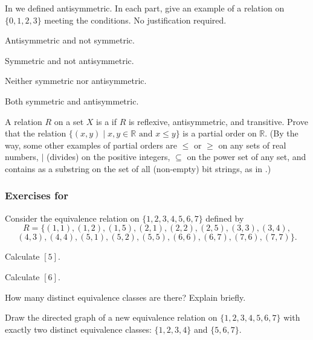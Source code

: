 \begin{exer}[\exerE] %
\label{exer_ppty_rel_sym_vs_antisym}
    In  we defined antisymmetric. In each part, give an example of a relation on $\{0,1,2,3\}$ meeting the conditions. No justification required.
        \begin{exerpart}
            \item Antisymmetric and not symmetric.
            \item Symmetric and not antisymmetric.
            \item Neither symmetric nor antisymmetric.
            \item Both symmetric and antisymmetric.
        \end{exerpart}
\end{exer}

\begin{exer}[\exerE] %
\label{exer_defn_partial_order}
    A relation $R$ on a set $X$ is a  if $R$ is reflexive, antisymmetric, and transitive. Prove that the relation $\{ (x,y) \mid x, y  \in \mathbb{R} \text{ and } x \le y \}$ is a partial order on $\mathbb{R}$.      
    (By the way, some other examples of partial orders are $\le$ or $\ge$ on any sets of real numbers, $\mid$ (divides) on the positive integers, $\subseteq$ on the power set of any set, and contains as a substring on the set of all (non-empty) bit strings, as in .)
\end{exer}


\subsubsection*{Exercises for 
\subequivclass}

\begin{exer}[\exerP] %
\label{exer_equiv_classes_1234567}
    Consider the equivalence relation on $\{1,2,3,4,5,6,7\}$ defined by 
        $$R=\{(1,1), (1,2), (1,5), (2,1), (2,2), (2,5), (3,3),(3,4),$$
        $$ (4,3), (4,4), (5,1), (5,2), (5,5), (6,6), (6,7), (7,6), (7,7)\}.$$
\begin{exerpart}
    \item Calculate $[5]$.
    \item Calculate $[6]$.
    \item How many distinct equivalence classes are there? Explain briefly.
    \item Draw the directed graph of a new equivalence relation on $\{1,2,3,4,5,6,7\}$ with exactly two distinct equivalence classes:  $\{1,2,3,4\}$ and $\{5,6,7\}$.
\end{exerpart}    
\end{exer}

